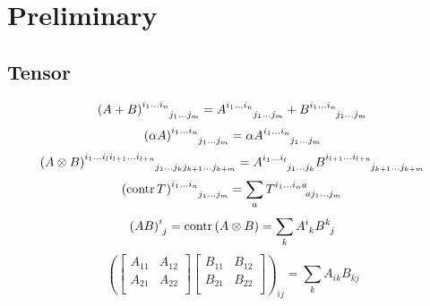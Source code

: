\documentclass[../main.tex]{subfiles}
\begin{document}
\section{Preliminary}

\subsection{Tensor}

\begin{equation}\label{Tensor:Sum}
    \tensor{\left(A+B\right)}{
        ^{i_1}^{\dots}^{i_n}
            _{j_1}_{\dots}_{j_m}
    }
    =
    \tensor{A}{
        ^{i_1}^{\dots}^{i_n}
            _{j_1}_{\dots}_{j_m}
    }
    +
    \tensor{B}{
        ^{i_1}^{\dots}^{i_n}
            _{j_1}_{\dots}_{j_m}
    }
\end{equation}
\begin{equation}\label{Tensor:Product:Scalar}
    \tensor{\left(\alpha A\right)}{
        ^{i_1}^{\dots}^{i_n}
            _{j_1}_{\dots}_{j_m}
    }
    =
    \alpha
    \tensor{A}{
        ^{i_1}^{\dots}^{i_n}
            _{j_1}_{\dots}_{j_m}
    }
\end{equation}
\begin{equation}\label{Tensor:Product:Tensor}
    \tensor{\left(A\otimes B\right)}{
        ^{i_1}^{\dots}^{i_l}^{i_{l+1}}^{\dots}^{i_{l+n}}
            _{j_1}_{\dots}_{j_k}_{j_{k+1}}_{\dots}_{j_{k+m}}
    }
    =
    \tensor{A}{
        ^{i_1}^{\dots}^{i_l}
            _{j_1}_{\dots}_{j_k}
    }
    \tensor{B}{
        ^{i_{l+1}}^{\dots}^{i_{l+n}}
            _{j_{k+1}}_{\dots}_{j_{k+m}}
    }
\end{equation}
\begin{equation}\label{Tensor:Contraction}
    \tensor{\left(\contr{\tensor{T}{}}\right)}{
        ^{i_1}^{\dots}^{i_n}
            _{j_1}_{\dots}_{j_m}
    }
    =
    \sum_a{\tensor{T}{
    ^{i_1}^{\dots}^{i_n}^a
    _a_{j_1}_{\dots}_{j_m}
    }}
\end{equation}
\begin{equation}\label{Matrix:Product}
    \tensor{\left(AB\right)}{^i_j}
    =\contr{\left(A\otimes B\right)}
    =\sum_k\tensor{A}{^i_k}\tensor{B}{^k_j}
\end{equation}
\begin{equation}\label{Matrix:Product:Block}
    \left(\begin{bmatrix}
        A_{11} & A_{12} \\
        A_{21} & A_{22} \\
    \end{bmatrix}
    \begin{bmatrix}
        B_{11} & B_{12} \\
        B_{21} & B_{22} \\
    \end{bmatrix}\right)_{ij}
    =
    \sum_k A_{ik} B_{kj}
\end{equation}
\end{document}
